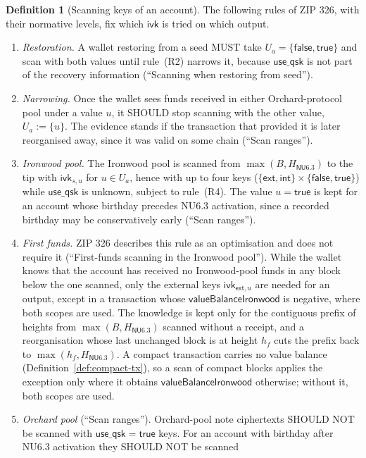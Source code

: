 \documentclass[11pt,a4paper]{article}
\theoremstyle{definition}
\newtheorem{definition}[theorem]{Definition}
\newcommand{\ivk}{\ensuremath{\mathsf{ivk}}}
\begin{document}
\begin{definition}[Scanning keys of an account]
The following rules of ZIP 326, with their normative levels, fix which
$\ivk$ is tried on which output.
\begin{enumerate}[label=(R\arabic*)]
\item \emph{Restoration.} A wallet restoring from a seed MUST take
  $U_a = \{\mathsf{false}, \mathsf{true}\}$ and scan with both values until
  rule~(R2) narrows it, because $\mathsf{use\_qsk}$ is not part of the
  recovery information (``Scanning when restoring from seed'').
\item \emph{Narrowing.} Once the wallet sees funds received in either
  Orchard-protocol pool under a value $u$, it SHOULD stop scanning with the
  other value, $U_a := \{u\}$. The evidence stands if the transaction that
  provided it is later reorganised away, since it was valid on some chain
  (``Scan ranges'').
\item \emph{Ironwood pool.} The Ironwood pool is scanned from
  $\max(B, H_{\mathsf{NU6.3}})$ to the tip with $\ivk_{s,u}$ for
  $u \in U_a$, hence with up to four keys
  ($\{\mathsf{ext}, \mathsf{int}\} \times \{\mathsf{false},
  \mathsf{true}\}$) while $\mathsf{use\_qsk}$ is unknown, subject to
  rule~(R4). The value $u = \mathsf{true}$ is kept for an account whose
  birthday precedes NU6.3 activation, since a recorded birthday may be
  conservatively early (``Scan ranges'').
\item \emph{First funds.} ZIP 326 describes this rule as an optimisation and
  does not require it (``First-funds scanning in the Ironwood pool''). While
  the wallet knows that the account has received no Ironwood-pool funds in
  any block below the one scanned, only the external keys $\ivk_{\mathsf{ext},
  u}$ are needed for an output, except in a transaction whose
  $\mathsf{valueBalanceIronwood}$ is negative, where both scopes are used.
  The knowledge is kept only for the contiguous prefix of heights from
  $\max(B, H_{\mathsf{NU6.3}})$ scanned without a receipt, and a
  reorganisation whose last unchanged block is at height $h_f$ cuts the
  prefix back to $\max(h_f, H_{\mathsf{NU6.3}})$. A compact transaction
  carries no value balance (Definition~\ref{def:compact-tx}), so a scan of
  compact blocks applies the exception only where it obtains
  $\mathsf{valueBalanceIronwood}$ otherwise; without it, both scopes are
  used.
\item \emph{Orchard pool} (``Scan ranges''). Orchard-pool note ciphertexts
  SHOULD NOT be scanned with $\mathsf{use\_qsk} = \mathsf{true}$ keys. For
  an account with birthday after NU6.3 activation they SHOULD NOT be scanned

\end{enumerate}
\end{definition}
\end{document}
